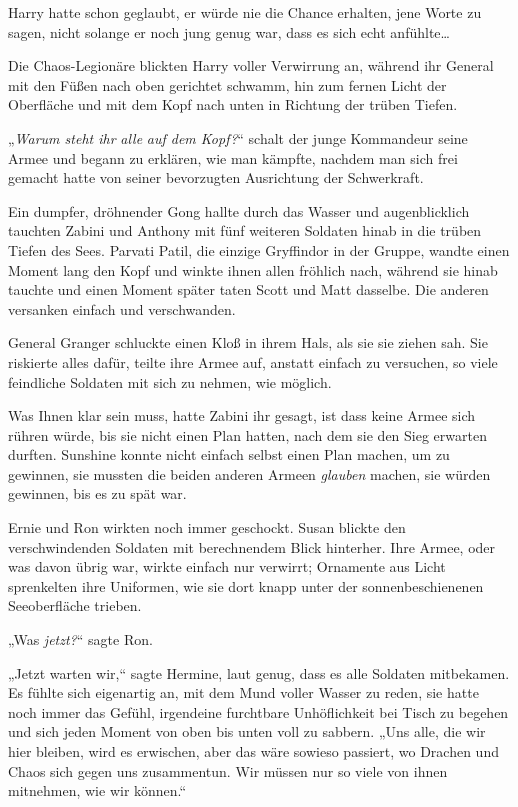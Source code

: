 {Harry hatte schon geglaubt, er würde nie die Chance erhalten, jene Worte zu sagen, nicht solange er noch jung genug war, dass es sich echt anfühlte…

Die Chaos-Legionäre blickten Harry voller Verwirrung an, während ihr General mit den Füßen nach oben gerichtet schwamm, hin zum fernen Licht der Oberfläche und mit dem Kopf nach unten in Richtung der trüben Tiefen.

„\emph{Warum steht ihr} \emph{alle} \emph{auf dem Kopf?}“ schalt der junge Kommandeur seine Armee und begann zu erklären, wie man kämpfte, nachdem man sich frei gemacht hatte von seiner bevorzugten Ausrichtung der Schwerkraft.

\later

Ein dumpfer, dröhnender Gong hallte durch das Wasser und augenblicklich tauchten Zabini und Anthony mit fünf weiteren Soldaten hinab in die trüben Tiefen des Sees. Parvati Patil, die einzige Gryffindor in der Gruppe, wandte einen Moment lang den Kopf und winkte ihnen allen fröhlich nach, während sie hinab tauchte und einen Moment später taten Scott und Matt dasselbe. Die anderen versanken einfach und verschwanden.

General Granger schluckte einen Kloß in ihrem Hals, als sie sie ziehen sah. Sie riskierte alles dafür, teilte ihre Armee auf, anstatt einfach zu versuchen, so viele feindliche Soldaten mit sich zu nehmen, wie möglich.

Was Ihnen klar sein muss, hatte Zabini ihr gesagt, ist dass keine Armee sich rühren würde, bis sie nicht einen Plan hatten, nach dem sie den Sieg erwarten durften. Sunshine konnte nicht einfach selbst einen Plan machen, um zu gewinnen, sie mussten die beiden anderen Armeen \emph{glauben} machen, sie würden gewinnen, bis es zu spät war.

Ernie und Ron wirkten noch immer geschockt. Susan blickte den verschwindenden Soldaten mit berechnendem Blick hinterher. Ihre Armee, oder was davon übrig war, wirkte einfach nur verwirrt; Ornamente aus Licht sprenkelten ihre Uniformen, wie sie dort knapp unter der sonnenbeschienenen Seeoberfläche trieben.

„Was \emph{jetzt?}“ sagte Ron.

„Jetzt warten wir,“ sagte Hermine, laut genug, dass es alle Soldaten mitbekamen. Es fühlte sich eigenartig an, mit dem Mund voller Wasser zu reden, sie hatte noch immer das Gefühl, irgendeine furchtbare Unhöflichkeit bei Tisch zu begehen und sich jeden Moment von oben bis unten voll zu sabbern. „Uns alle, die wir hier bleiben, wird es erwischen, aber das wäre sowieso passiert, wo Drachen und Chaos sich gegen uns zusammentun. Wir müssen nur so viele von ihnen mitnehmen, wie wir können.“

}

